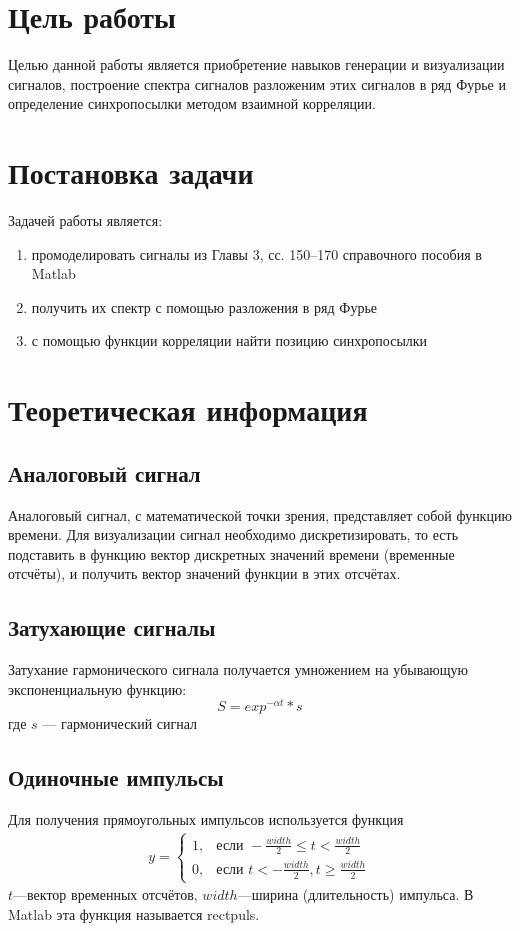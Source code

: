 






\section{Цель работы}
Целью данной работы является приобретение навыков генерации и визуализации сигналов, построение спектра сигналов разложеним этих сигналов в ряд Фурье и определение синхропосылки методом взаимной корреляции.

\section{Постановка задачи}
Задачей работы является:
\begin{enumerate}
\item промоделировать сигналы из Главы 3, сс. 150–170 справочного пособия в Matlab
\item получить их спектр с помощью разложения в ряд Фурье
\item с помощью функции корреляции найти позицию синхропосылки
\end{enumerate}

\section{Теоретическая информация}
\subsection{Аналоговый сигнал}
Аналоговый сигнал, с математической точки зрения, представляет собой функцию времени.
Для визуализации сигнал необходимо дискретизировать, то есть подставить в функцию 
вектор дискретных значений времени (временные отсчёты), и получить вектор значений
функции в этих отсчётах.


\subsection{Затухающие сигналы}
Затухание гармонического сигнала получается умножением на убывающую экспоненциальную функцию:
\begin{equation}
	S = exp^{-\alpha t} * s
\end{equation}
где $s$ --- гармонический сигнал

\subsection{Одиночные импульсы}
Для получения прямоугольных импульсов используется функция 
\begin{eqnarray}
y =
\begin{cases}
1, & \text{если } -\frac{width}{2} \leq t < \frac{width}{2}\\
0, & \text{если } t<-\frac{width}{2} , t \geq \frac{width}{2}
\end{cases}
\end{eqnarray}
$t$---вектор временных отсчётов, $width$---ширина (длительность) импульса.
В Matlab эта функция называется rectpuls.


